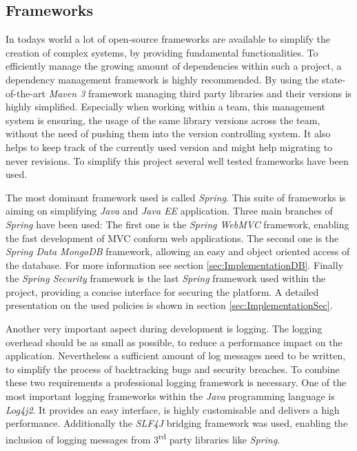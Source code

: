 \subsection{Frameworks}
\label{sec:FrameworksServer}

In todays world a lot of open-source frameworks are available to simplify the creation of complex systems, by providing fundamental functionalities. To efficiently manage the growing amount of dependencies within such a project, a dependency management framework is highly recommended. By using the state-of-the-art \emph{Maven 3} framework managing third party libraries and their versions is highly simplified. Especially when working within a team, this management system is ensuring, the usage of the same library versions across the team, without the need of pushing them into the version controlling system. It also helps to keep track of the currently used version and might help migrating to never revisions. To simplify this project several well tested frameworks have been used.

The most dominant framework used is called \emph{Spring}. This suite of frameworks is aiming on simplifying \emph{Java} and \emph{Java EE} application. Three main branches of \emph{Spring} have been used: The first one is the \emph{Spring WebMVC} framework, enabling the fast development of \gls{MVC} conform web applications. The second one is the \emph{Spring Data MongoDB} framework, allowing an easy and object oriented access of the database. For more information see section \vref{sec:ImplementationDB}. Finally the \emph{Spring Security} framework is the last \emph{Spring} framework used within the project, providing a concise interface for securing the platform. A detailed presentation on the used policies is shown in section \vref{sec:ImplementationSec}.

Another very important aspect during development is logging. The logging overhead should be as small as possible, to reduce a performance impact on the application. Nevertheless a sufficient amount of log messages need to be written, to simplify the process of backtracking bugs and security breaches. To combine these two requirements a professional logging framework is necessary. One of the most important logging frameworks within the \emph{Java} programming language is \emph{Log4j2}. It provides an easy interface, is highly customisable and delivers a high performance. Additionally the \emph{SLF4J} bridging framework was used, enabling the inclusion of logging messages from 3\textsuperscript{rd} party libraries like \emph{Spring}.

